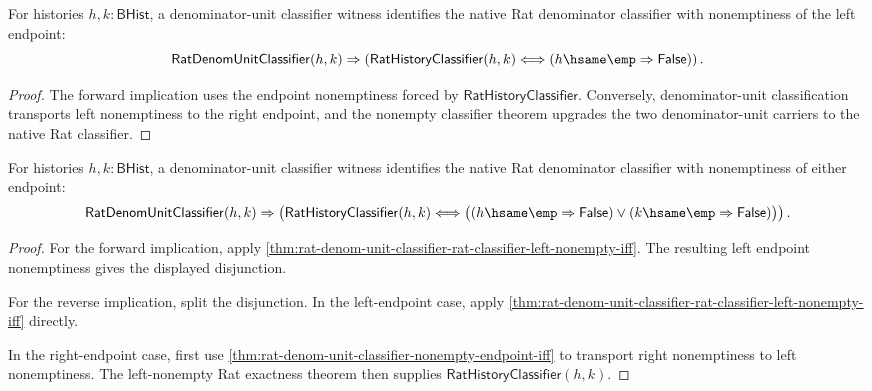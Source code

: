 \begin{theorem}
\label{thm:rat-denom-unit-classifier-rat-classifier-left-nonempty-iff}
For histories $h,k:\mathsf{BHist}$, a denominator-unit classifier witness
identifies the native Rat denominator classifier with nonemptiness of the
left endpoint:
$$
\mathsf{RatDenomUnitClassifier}(h,k)\Rightarrow
\left(
\mathsf{RatHistoryClassifier}(h,k)
\Longleftrightarrow
(h\hsame\emp\Rightarrow\mathsf{False})
\right).
$$
\end{theorem}
\begin{proof}
The forward implication uses the endpoint nonemptiness forced by
$\mathsf{RatHistoryClassifier}$. Conversely, denominator-unit classification
transports left nonemptiness to the right endpoint, and the nonempty
classifier theorem upgrades the two denominator-unit carriers to the native
Rat classifier.
\end{proof}

\begin{theorem}
\label{thm:rat-denom-unit-classifier-either-nonempty-rat-exactness}
For histories $h,k:\mathsf{BHist}$, a denominator-unit classifier witness
identifies the native Rat denominator classifier with nonemptiness of either
endpoint:
$$
\mathsf{RatDenomUnitClassifier}(h,k)\Rightarrow
\left(
\mathsf{RatHistoryClassifier}(h,k)
\Longleftrightarrow
\bigl((h\hsame\emp\Rightarrow\mathsf{False})\lor
(k\hsame\emp\Rightarrow\mathsf{False})\bigr)
\right).
$$
\end{theorem}
\begin{proof}
For the forward implication, apply
\autoref{thm:rat-denom-unit-classifier-rat-classifier-left-nonempty-iff}.
The resulting left endpoint nonemptiness gives the displayed disjunction.

For the reverse implication, split the disjunction. In the left-endpoint case,
apply
\autoref{thm:rat-denom-unit-classifier-rat-classifier-left-nonempty-iff}
directly.

In the right-endpoint case, first use
\autoref{thm:rat-denom-unit-classifier-nonempty-endpoint-iff} to transport
right nonemptiness to left nonemptiness. The left-nonempty Rat exactness theorem
then supplies $\mathsf{RatHistoryClassifier}(h,k)$.
\end{proof}

